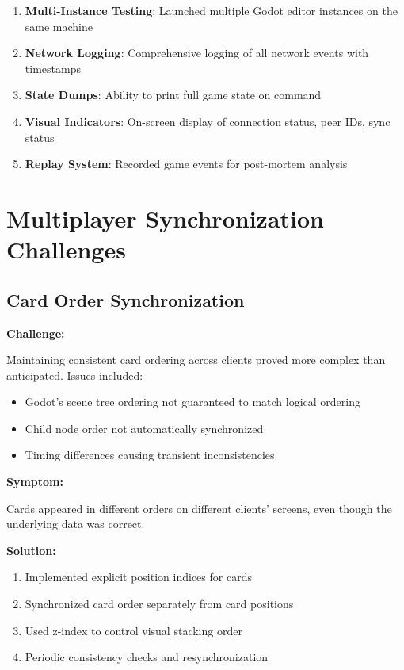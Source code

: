 \begin{enumerate}
    \item \textbf{Multi-Instance Testing}: Launched multiple Godot editor instances on the same machine
    \item \textbf{Network Logging}: Comprehensive logging of all network events with timestamps
    \item \textbf{State Dumps}: Ability to print full game state on command
    \item \textbf{Visual Indicators}: On-screen display of connection status, peer IDs, sync status
    \item \textbf{Replay System}: Recorded game events for post-mortem analysis
\end{enumerate}

\section{Multiplayer Synchronization Challenges}
\label{sec:sync-challenges}

\subsection{Card Order Synchronization}
\label{subsec:card-order-sync}

\textbf{Challenge:}

Maintaining consistent card ordering across clients proved more complex than anticipated. Issues included:
\begin{itemize}
    \item Godot's scene tree ordering not guaranteed to match logical ordering
    \item Child node order not automatically synchronized
    \item Timing differences causing transient inconsistencies
\end{itemize}

\textbf{Symptom:}

Cards appeared in different orders on different clients' screens, even though the underlying data was correct.

\textbf{Solution:}

\begin{enumerate}
    \item Implemented explicit position indices for cards
    \item Synchronized card order separately from card positions
    \item Used z-index to control visual stacking order
    \item Periodic consistency checks and resynchronization
\end{enumerate}

